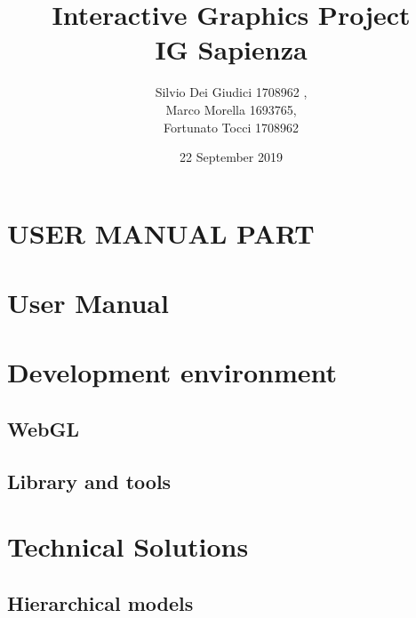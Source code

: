 \documentclass[a4paper, 11pt]{article}
\title { Interactive Graphics Project\\ \bigskip \large IG Sapienza}
\date{22 September 2019}
\author{Silvio Dei Giudici 1708962 , \\Marco Morella 1693765, \\Fortunato Tocci 1708962}
\begin{document}
\maketitle

\section{USER MANUAL PART}
\section{User Manual}

\section{Development environment}
\subsection{WebGL}
\subsection{Library and tools}

\section{Technical Solutions}

\subsection{Hierarchical models}
\end{document}
